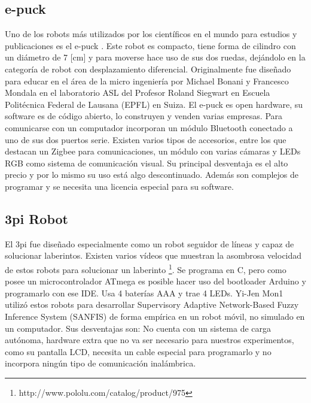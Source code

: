 \subsection{e-puck}
Uno de los robots más utilizados por los científicos en el mundo para estudios y publicaciones es el e-puck \cite{mondada2009puck}. Este robot es compacto, tiene forma de cilindro con un diámetro de 7 [cm] y para moverse hace uso de sus dos ruedas, dejándolo en la categoría de robot con desplazamiento diferencial. Originalmente fue diseñado para educar en el área de la micro ingeniería por Michael Bonani y Francesco Mondala en el laboratorio ASL del Profesor Roland Siegwart en Escuela Politécnica Federal de Lausana (EPFL) en Suiza. El e-puck es open hardware, su software es de código abierto,  lo construyen y venden varias empresas. Para comunicarse con un computador incorporan un módulo Bluetooth conectado a uno de sus dos puertos serie. Existen varios tipos de accesorios, entre los que destacan un Zigbee para comunicaciones, un módulo con varias cámaras y LEDs RGB como sistema de comunicación visual. Su principal desventaja es el alto precio y por lo mismo su uso está algo descontinuado. Además son complejos de programar y se necesita una licencia especial para su software.

\subsection{3pi Robot}

El 3pi fue diseñado especialmente como un robot seguidor de líneas y capaz de solucionar laberintos. Existen varios vídeos que muestran la asombrosa velocidad de estos robots para solucionar un laberinto \footnote{http://www.pololu.com/catalog/product/975}. Se programa en C, pero como posee un microcontrolador ATmega es posible hacer uso del bootloader Arduino y programarlo con ese IDE. Usa 4 baterías AAA y trae 4 LEDs.  Yi-Jen Mon1 utilizó estos robots para desarrollar Supervisory Adaptive Network-Based Fuzzy Inference System (SANFIS) de forma empírica en un robot móvil, no simulado en un computador. Sus desventajas son: No cuenta con un sistema de carga autónoma, hardware extra que no va ser necesario para nuestros experimentos, como su pantalla LCD, necesita un cable especial para programarlo y no incorpora ningún tipo de comunicación inalámbrica.



